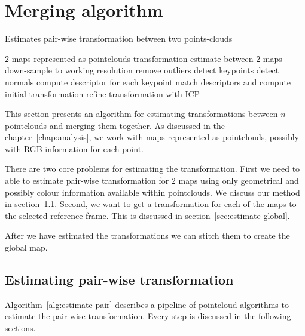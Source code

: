 \chapter{Merging algorithm}
\label{chap:mergingalgorithm}


\begin{algorithm}
    \caption[Pair-wise transformation estimation]{Estimates pair-wise transformation between two points-clouds}
    \label{alg:estimate-pair}
    \begin{algorithmic}[1]
        \Require $2$ maps represented as pointclouds
        \Ensure transformation estimate between $2$ maps
            \State down-sample to working resolution
            \State remove outliers
            \State detect keypoints
            \State detect normals
            \State compute descriptor for each keypoint
            \State match descriptors and compute initial transformation
            \State refine transformation with \gls{ICP}
        \EndProcedure
    \end{algorithmic}
\end{algorithm}

This section presents an algorithm for estimating transformations between $n$ pointclouds and merging them together. As discussed in the chapter~\ref{chap:analysis}, we work with maps represented as pointclouds, possibly with RGB information for each point.

There are two core problems for estimating the transformation. First we need to able to estimate pair-wise transformation for $2$ maps using only geometrical and possibly colour information available within pointclouds. We discuss our method in section~\ref{sec:estimate-pair-wise}. Second, we want to get a transformation for each of the maps to the selected reference frame. This is discussed in section~\ref{sec:estimate-global}.

After we have estimated the transformations we can stitch them to create the global map.

\section{Estimating pair-wise transformation}
\label{sec:estimate-pair-wise}

Algorithm~\ref{alg:estimate-pair} describes a pipeline of pointcloud algorithms to estimate the pair-wise transformation. Every step is discussed in the following sections.

